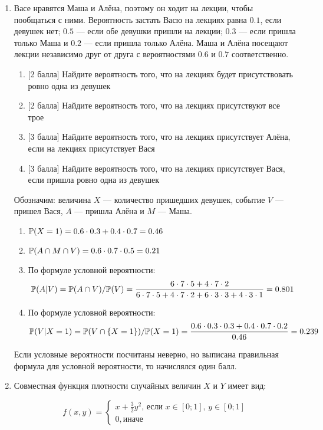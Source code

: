 \documentclass[pdftex,12pt,a4paper]{article}
\begin{document}
\begin{enumerate}
\item Васе нравятся Маша и Алёна, поэтому он ходит на лекции, чтобы пообщаться с ними. Вероятность застать Васю на лекциях равна $0.1$, если девушек нет; $0.5$ --- если обе девушки пришли на лекции; $0.3$ --- если пришла только Маша и $0.2$ --- если пришла только Алёна. Маша и Алёна посещают лекции независимо друг от друга с вероятностями $0.6$ и $0.7$ соответственно.


\begin{enumerate}
\item $[$2 балла]  Найдите вероятность того, что на лекциях будет присутствовать ровно одна из девушек
\item $[$2 балла]  Найдите вероятность того, что на лекциях присутствуют все трое
\item $[$3 балла]  Найдите вероятность того, что на лекциях присутствует Алёна, если на лекциях присутствует Вася
\item $[$3 балла] Найдите вероятность того, что на лекциях присутствует Вася, если пришла ровно одна из девушек
\end{enumerate}

\solution


Обозначим: величина $X$ --- количество пришедших девушек, событие $V$ --- пришел Вася, $A$ --- пришла Алёна и $M$ --- Маша. 
\begin{enumerate}
\item $\P(X=1)=0.6\cdot 0.3+0.4\cdot 0.7=0.46$
\item $\P(A\cap M\cap V)=0.6\cdot 0.7\cdot 0.5=0.21$
\item По формуле условной вероятности:
\[
\P(A|V)=\P(A\cap V)/\P(V)=\frac{6\cdot 7\cdot 5 + 4\cdot 7 \cdot 2}
{6\cdot 7\cdot 5 + 4\cdot 7 \cdot 2+ 6\cdot 3\cdot 3 + 4\cdot 3\cdot 1}=0.801
\]
\item По формуле условной вероятности:
\[
\P(V|X=1)=\P(V\cap \{X=1\})/\P(X=1)=\frac{0.6\cdot 0.3\cdot 0.3+0.4\cdot 0.7\cdot 0.2}{0.46}=0.239
\]
\end{enumerate}

Если условные вероятности посчитаны неверно, но выписана правильная формула для условной вероятности, то начислялся один балл.

\vspace{6pt}

\item Совместная функция плотности случайных величин $X$ и $Y$ имеет вид:

\[
f(x,y)=
\begin{cases}
x+\frac{3}{2} y^{2}, \, \text{если } x\in [0;1],\, y\in[0;1] \\
0, \text{иначе} 
\end{cases}
\] 


\end{enumerate}
\end{document}
